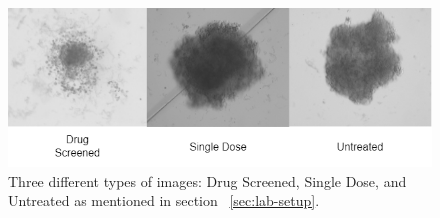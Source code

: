 \begin{figure}[H]
  \centering
  \includegraphics[scale=0.6]{figures/originals.png} 
  \caption{Three different types of images: Drug Screened, Single Dose, and Untreated as mentioned in section ~\ref{sec:lab-setup}.}
  \label{fig:originals}
\end{figure}

